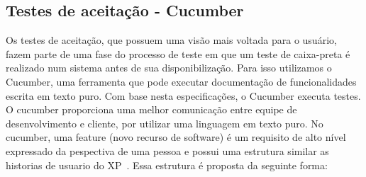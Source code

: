 \subsection{Testes de aceitação - Cucumber}
Os testes de aceitação, que possuem uma visão mais voltada para o usuário, fazem 
parte de uma fase do processo de teste em que um teste de caixa-preta é realizado 
num sistema antes de sua disponibilização. Para isso utilizamos o Cucumber, uma 
ferramenta que pode executar documentação de funcionalidades escrita em texto puro. 
Com base nesta especificações, o Cucumber executa testes.
%
O cucumber proporciona uma melhor comunicação entre equipe de desenvolvimento e 
cliente, por utilizar uma linguagem  em texto puro.
%
No cucumber, uma feature (novo recurso de software) é um requisito de alto nível 
expressado da pespectiva de uma pessoa e possui uma estrutura similar as historias 
de usuario do XP~\cite{chelimsky2010}. Essa estrutura é proposta da seguinte forma:
